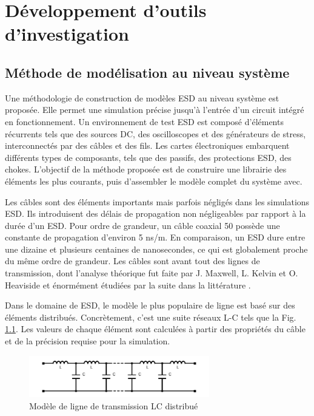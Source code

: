\chapter{Développement d'outils d'investigation}
\label{chap:2}
\section{Méthode de modélisation au niveau système}

Une méthodologie de construction de modèles ESD au niveau système est proposée.
Elle permet une simulation précise jusqu'à l'entrée d'un circuit intégré en fonctionnement.
Un environnement de test ESD est composé d'éléments récurrents tels que des sources DC, des oscilloscopes et des générateurs de stress, interconnectés par des câbles et des fils.
Les cartes électroniques embarquent différents types de composants, tels que des passifs, des protections ESD, des chokes.
L'objectif de la méthode proposée est de construire une librairie des éléments les plus courants, puis d'assembler le modèle complet du système avec.

Les câbles sont des éléments importants mais parfois négligés dans les simulations ESD.
Ils introduisent des délais de propagation non négligeables par rapport à la durée d'un ESD.
Pour ordre de grandeur, un câble coaxial 50\textOmega{} possède une constante de propagation d'environ 5 ns/m.
En comparaison, un ESD dure entre une dizaine et plusieurs centaines de nanosecondes, ce qui est globalement proche du même ordre de grandeur.
Les câbles sont avant tout des lignes de transmission, dont l'analyse théorique fut faite par J. Maxwell, L. Kelvin et O. Heaviside et énormément étudiées par la suite dans la littérature \cite{branin-tl-ref, hf-coax,lossy-tl,emc-analysis-tl}.

Dans le domaine de ESD, le modèle le plus populaire de ligne est basé sur des éléments distribués.
Concrètement, c'est une suite réseaux L-C tels que la Fig. \ref{fig:dis-line-model}.
Les valeurs de chaque élément sont calculées à partir des propriétés du câble et de la précision requise pour la simulation.

\begin{figure}[!h]
  \centering
  \includegraphics[width=0.7\textwidth]{src/1/figures/lc_ladder.pdf}
  \caption{Modèle de ligne de transmission LC distribué}
  \label{fig:dis-line-model}
\end{figure}

